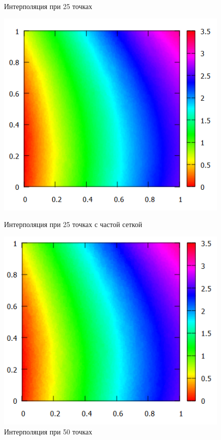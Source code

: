 \documentclass[14pt, a4paper]{extarticle}
\begin{document}
\begin{enumerate}
\begin{figure}[H]
\begin{minipage}{0.5\textwidth}
					\caption[.] {Интерполяция при 25 точках}
				\end{minipage}\hfill
			\end{figure}
			\begin{figure}[H]
				\begin{minipage}{0.5\textwidth}
					\centering
					\includegraphics[width = \linewidth]{../1func/M=25T=17101Err=0.0067239.png}
					\caption[.] {Интерполяция при 25 точках с частой сеткой}
				\end{minipage}\hfill
				\begin{minipage}{0.5\textwidth}
					\centering
					\includegraphics[width = \linewidth]{../1func/M=50T=5774Err=0.007454.png}
					\caption[.] {Интерполяция при 50 точках}
				\end{minipage}\hfill
			\end{figure}
		

\end{enumerate}
\end{document}
